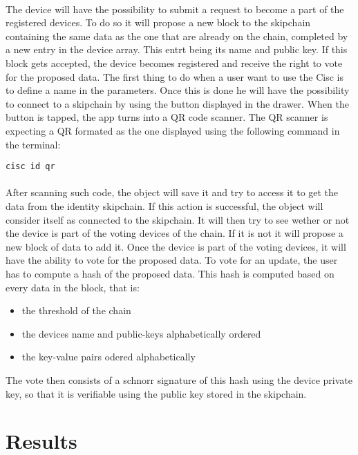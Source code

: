 \paragraph{}
The device will have the possibility to submit a request to become a part of the registered devices. To do so it will propose a new block to the skipchain containing the same data as the one that are already on the chain, completed by a new entry in the device array. This entrt being its name and public key. If this block gets accepted, the device becomes registered and receive the right to vote for the proposed data.
The first thing to do when a user want to use the Cisc is to define a name in the parameters. Once this is done he will have the possibility to connect to a skipchain by using the button displayed in the drawer. When the button is tapped, the app turns into a QR code scanner. The QR scanner is expecting a QR formated as the one displayed using the following command in the terminal:
\begin{lstlisting}
cisc id qr
\end{lstlisting}

\paragraph{}
After scanning such code, the object will save it and try to access it to get the data from the identity skipchain. If this action is successful, the object will consider itself as connected to the skipchain. It will then try to see wether or not the device is part of the voting devices of the chain. If it is not it will propose a new block of data to add it.
Once the device is part of the voting devices, it will have the ability to vote for the proposed data.
To vote for an update, the user has to compute a hash of the proposed data. This hash is computed based on every data in the block, that is:
\begin{itemize}
  \item the threshold of the chain
  \item the devices name and public-keys alphabetically ordered
  \item the key-value pairs odered alphabetically
\end{itemize}
The vote then consists of a schnorr signature of this hash using the device private key, so that it is verifiable using the public key stored in the skipchain.

\section{Results}

